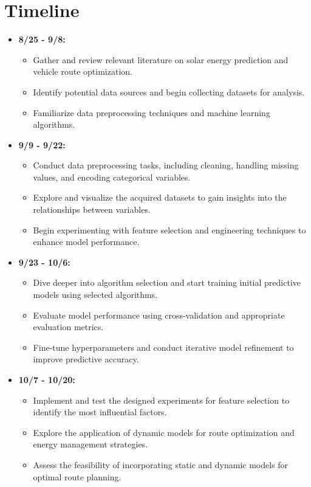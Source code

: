 \documentclass[10pt,twocolumn]{article}
\begin{document}
\section{Timeline}
\begin{itemize}
    \item \textbf{8/25 - 9/8:} 
    \begin{itemize}
        \item Gather and review relevant literature on solar energy prediction and vehicle route optimization.
        \item Identify potential data sources and begin collecting datasets for analysis.
        \item Familiarize data preprocessing techniques and machine learning algorithms.
    \end{itemize}
    
    \item \textbf{9/9 - 9/22:} 
    \begin{itemize}
        \item Conduct data preprocessing tasks, including cleaning, handling missing values, and encoding categorical variables.
        \item Explore and visualize the acquired datasets to gain insights into the relationships between variables.
        \item Begin experimenting with feature selection and engineering techniques to enhance model performance.
    \end{itemize}
    
    \item \textbf{9/23 - 10/6:} 
    \begin{itemize}
        \item Dive deeper into algorithm selection and start training initial predictive models using selected algorithms.
        \item Evaluate model performance using cross-validation and appropriate evaluation metrics.
        \item Fine-tune hyperparameters and conduct iterative model refinement to improve predictive accuracy.
    \end{itemize}
    
    \item \textbf{10/7 - 10/20:} 
    \begin{itemize}
        \item Implement and test the designed experiments for feature selection to identify the most influential factors.
        \item Explore the application of dynamic models for route optimization and energy management strategies.
        \item Assess the feasibility of incorporating static and dynamic models for optimal route planning.
    \end{itemize}
    

\end{itemize}
\end{document}
